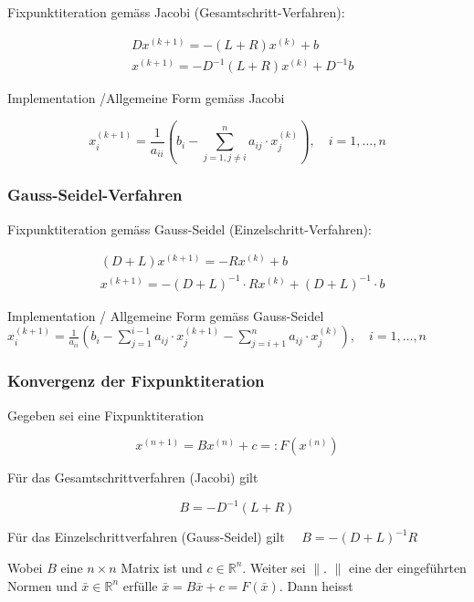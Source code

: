 Fixpunktiteration gemäss Jacobi (Gesamtschritt-Verfahren):

$$
\begin{aligned}
& D x^{(k+1)}=-(L+R) x^{(k)}+b \\
& x^{(k+1)}=-D^{-1}(L+R) x^{(k)}+D^{-1} b
\end{aligned}
$$

Implementation /Allgemeine Form gemäss Jacobi

$$
x_{i}^{(k+1)}=\frac{1}{a_{i i}}\left(b_{i}-\sum_{j=1, j \neq i}^{n} a_{i j} \cdot x_{j}^{(k)}\right), \quad i=1, \ldots, n
$$

\subsubsection{Gauss-Seidel-Verfahren}

Fixpunktiteration gemäss Gauss-Seidel (Einzelschritt-Verfahren):

$$
\begin{aligned}
& (D+L) x^{(k+1)}=-R x^{(k)}+b \\
& x^{(k+1)}=-(D+L)^{-1} \cdot R x^{(k)}+(D+L)^{-1} \cdot b
\end{aligned}
$$

Implementation / Allgemeine Form gemäss Gauss-Seidel\\
$x_{i}^{(k+1)}=\frac{1}{a_{i i}}\left(b_{i}-\sum_{j=1}^{i-1} a_{i j} \cdot x_{j}^{(k+1)}-\sum_{j=i+1}^{n} a_{i j} \cdot x_{j}^{(k)}\right), \quad i=1, \ldots, n$

\subsubsection{Konvergenz der Fixpunktiteration}

Gegeben sei eine Fixpunktiteration

$$
x^{(n+1)}=B x^{(n)}+c=: F\left(x^{(n)}\right)
$$

Für das Gesamtschrittverfahren (Jacobi) gilt

$$
B=-D^{-1}(L+R)
$$

Für das Einzelschrittverfahren (Gauss-Seidel) gilt $\quad B=-(D+L)^{-1} R$

Wobei $B$ eine $n \times n$ Matrix ist und $c \in \mathbb{R}^{n}$. Weiter sei $\|$. $\|$ eine der eingeführten Normen und $\bar{x} \in \mathbb{R}^{n}$ erfülle $\bar{x}=B \bar{x}+c=F(\bar{x})$. Dann heisst

